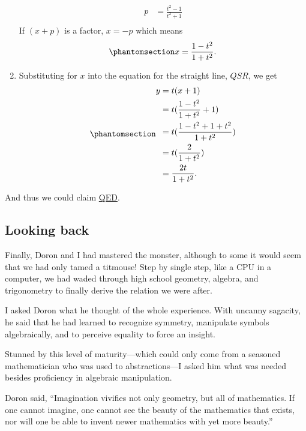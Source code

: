 \documentclass[
  a4paper,
]{article}
\begin{document}
\begin{enumerate}
\[\begin{aligned}
  p &= \frac{t^2 - 1}{t^2 + 1}\\
  \end{aligned}
  \] If \((x + p)\) is a factor, \(x = -p\) which means
  \begin{equation}\phantomsection\label{eq:forx}{
  x = \frac{1 - t^2}{1 + t^2}.
  }\end{equation}
\item
  Substituting for \(x\) into the equation for the straight line,
  \(QSR\), we get \begin{equation}\phantomsection\label{eq:fory}{
  \begin{aligned}
  y &= t(x + 1)\\
  &= t(\frac{1 - t^2}{1 + t^2} + 1)\\
  &= t(\frac{1 - t^2 + 1 + t^2}{1 + t^2})\\
  &= t(\frac{2}{1 + t^2})\\
  &= \frac{2t}{1 + t^2}.
  \end{aligned} 
  }\end{equation}
\end{enumerate}

And thus we could claim
\href{https://en.wikipedia.org/wiki/Q.E.D.}{QED}.

\subsection{Looking back}\label{looking-back}

Finally, Doron and I had mastered the monster, although to some it would
seem that we had only tamed a titmouse! Step by single step, like a CPU
in a computer, we had waded through high school geometry, algebra, and
trigonometry to finally derive the relation we were after.

I asked Doron what he thought of the whole experience. With uncanny
sagacity, he said that he had learned to recognize symmetry, manipulate
symbols algebraically, and to perceive equality to force an insight.

Stunned by this level of maturity---which could only come from a
seasoned mathematician who was used to abstractions---I asked him what
was needed besides proficiency in algebraic manipulation.

Doron said, ``Imagination vivifies not only geometry, but all of
mathematics. If one cannot imagine, one cannot see the beauty of the
mathematics that exists, nor will one be able to invent newer
mathematics with yet more beauty.''
\end{document}
